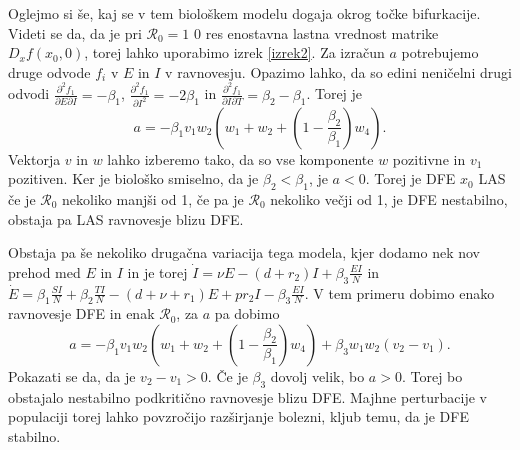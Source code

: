 \documentclass[a4paper,12pt]{article}
\newcommand{\R}{\mathcal R}
\begin{document}
Oglejmo si še, kaj se v tem biološkem modelu dogaja okrog točke bifurkacije. 
Videti se da, da je pri \(\R_0=1\) \(0\) res enostavna lastna vrednost matrike 
\(D_xf(x_0,0)\), torej lahko uporabimo izrek \ref{izrek2}. Za izračun \(a\) potrebujemo 
druge odvode \(f_i\) v \(E\) in \(I\) v ravnovesju. Opazimo lahko, da so edini neničelni drugi odvodi
\(\frac{\partial^2f_1}{\partial E \partial I}=-\beta_1\), 
\(\frac{\partial^2f_1}{\partial I^2}=-2\beta_1\) in 
\(\frac{\partial^2f_1}{\partial I \partial T}=\beta_2-\beta_1\). 
Torej je \[a=-\beta_1 v_1 w_2(w_1+w_2+(1-\frac{\beta_2}{\beta_1})w_4).\]
Vektorja \(v\) in \(w\) lahko izberemo tako, da so vse komponente \(w\) pozitivne 
in \(v_1\) pozitiven. Ker je biološko smiselno, da je \(\beta_2<\beta_1\), je \(a<0\). 
Torej je DFE \(x_0\) LAS če je \(\R_0\) nekoliko manjši od 1, če pa je \(\R_0\) nekoliko večji od 1,
je DFE nestabilno, obstaja pa LAS ravnovesje blizu DFE. 

Obstaja pa še nekoliko drugačna variacija tega modela, kjer dodamo 
nek nov prehod med \(E\) in \(I\) in je torej 
\(\dot{I}=\nu E -(d+r_2)I +\beta_3 \frac{EI}{N}\) in \(\dot{E}= \beta_1\frac{SI}{N}+\beta_2\frac{TI}{N}-(d+\nu+r_1)E+pr_2I-\beta_3 \frac{EI}{N}\).
V tem primeru dobimo enako ravnovesje DFE in enak \(\R_0\), za \(a\) pa dobimo 
\[a=-\beta_1v_1w_2(w_1+w_2+(1-\frac{\beta_2}{\beta_1})w_4)+\beta_3w_1w_2(v_2-v_1).\]
Pokazati se da, da je \(v_2-v_1>0\). Če je \(\beta_3\) dovolj velik, bo \(a>0\). 
Torej bo obstajalo nestabilno podkritično ravnovesje blizu DFE. Majhne perturbacije v populaciji 
torej lahko povzročijo razširjanje bolezni, kljub temu, da je DFE stabilno.
\end{document}
